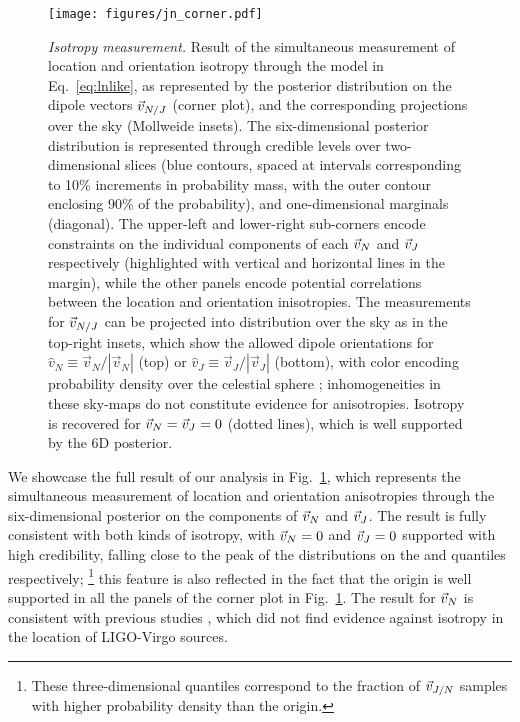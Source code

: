 \documentclass[aps,prd,twocolumn,superscriptaddress,preprintnumbers,floatfix,nofootinbib]{revtex4-2}
\newcommand{\clJ}{}
\newcommand{\clN}{}
\begin{document}
\begin{figure*}[p]
\texttt{[image: figures/jn\_corner.pdf]}
\caption{\emph{Isotropy measurement.} Result of the simultaneous measurement of location and orientation isotropy through the model in Eq.~\eqref{eq:lnlike}, as represented by the posterior distribution on the dipole vectors $\vec{v}_{N/J}$ (corner plot), and the corresponding projections over the sky (Mollweide insets).
The six-dimensional posterior distribution is represented through credible levels over two-dimensional slices (blue contours, spaced at intervals corresponding to 10\% increments in probability mass, with the outer contour enclosing 90\% of the probability), and one-dimensional marginals (diagonal).
The upper-left and lower-right sub-corners encode constraints on the individual components of each $\vec{v}_{N}$ and $\vec{v}_{J}$ respectively (highlighted with vertical and horizontal lines in the margin), while the other panels encode potential correlations between the location and orientation inisotropies.
The measurements for $\vec{v}_{N/J}$ can be projected into distribution over the sky as in the top-right insets, which show the allowed dipole orientations for $\hat{v}_N \equiv \vec{v}_N / |\vec{v}_N|$ (top) or $\hat{v}_J \equiv \vec{v}_J / |\vec{v}_J|$ (bottom), with color encoding probability density over the celestial sphere \cite{skymap,Singer:2016eax,Singer:2016erz}; inhomogeneities in these sky-maps do not constitute evidence for anisotropies.
Isotropy is recovered for $\vec{v}_{N} = \vec{v}_{J} = 0$ (dotted lines), which is well supported by the 6D posterior.
}
\label{fig:jn_corner}
\end{figure*}

We showcase the full result of our analysis in Fig.~\ref{fig:jn_corner}, which represents the simultaneous measurement of location and orientation anisotropies through the six-dimensional posterior on the components of $\vec{v}_{N}$ and $\vec{v}_{J}$.
The result is fully consistent with both kinds of isotropy, with $\vec{v}_{N} = 0$ and $\vec{v}_{J} = 0$ supported with high credibility, falling close to the peak of the distributions on the \clN and \clJ quantiles respectively;%
\footnote{These three-dimensional quantiles correspond to the fraction of $\vec{v}_{J/N}$ samples with higher probability density than the origin.}
 this feature is also reflected in the fact that the origin is well supported in all the panels of the corner plot in Fig.~\ref{fig:jn_corner}.
The result for $\vec{v}_{N}$ is consistent with previous studies \cite{Essick:2022slj}, which did not find evidence against isotropy in the location of LIGO-Virgo sources.
\end{document}
